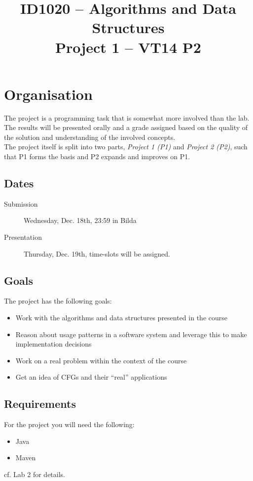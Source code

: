 \documentclass[11pt]{article}
\title{ID1020 -- Algorithms and Data Structures \\ Project 1 -- VT14 P2}
\author{}
\date{}                                           %
\begin{document}
\maketitle
\section{Organisation}
The project is a programming task that is somewhat more involved than the lab. The results will be presented orally and a grade assigned based on the quality of the solution and understanding of the involved concepts.\\

The project itself is split into two parts, \emph{Project 1 (P1)} and \emph{Project 2 (P2)}, such that P1 forms the basis and P2 expands and improves on P1.

\subsection{Dates}
\begin{description}
\item[Submission] Wednesday, Dec. 18th, 23:59 in Bilda
\item[Presentation] Thursday, Dec. 19th, time-slots will be assigned.
\end{description}

\subsection{Goals}
The project has the following goals:
\begin{itemize}
\item Work with the algorithms and data structures presented in the course
\item Reason about usage patterns in a software system and leverage this to make implementation decisions
\item Work on a real problem within the context of the course
\item Get an idea of CFGs and their ``real'' applications
\end{itemize}

\subsection{Requirements}
\label{ssec:reqs}
For the project you will need the following:
\begin{itemize}
\item Java
\item Maven
\end{itemize}
cf. Lab 2 for details.
\end{document}
